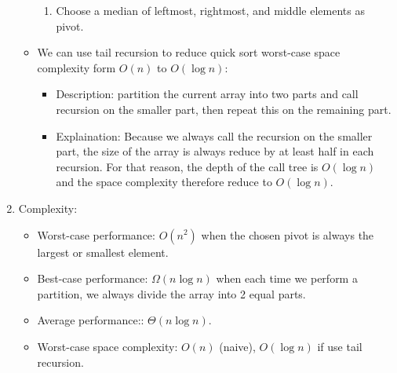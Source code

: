 \documentclass[12pt]{article}
\begin{document}
\begin{enumerate}
\begin{itemize}
\begin{enumerate}
                \item Choose a median of leftmost, rightmost, and middle elements as pivot.
            \end{enumerate}
            \item We can use tail recursion to reduce quick sort worst-case space complexity form $O(n)$ to $O(\log n)$:
            \begin{itemize}
                \item Description: partition the current array into two parts and call recursion on the smaller part, then repeat this on the remaining part.
                \item Explaination: Because we always call the recursion on the smaller part, the size of the array is always reduce by at least half in each recursion. For that reason, the depth of the call tree is $O(\log n)$ and the space complexity therefore reduce to $O(\log n)$.
            \end{itemize}
        \end{itemize}
        \item Complexity:
        \begin{itemize}
            \item Worst-case performance: $O(n^2)$ when the chosen pivot is always the largest or smallest element.
            \item Best-case performance: $\Omega(n\log n)$ when each time we perform a partition, we always divide the array into 2 equal parts.
            \item Average performance:: $\Theta(n\log n)$.
            \item Worst-case space complexity: $O(n)$ (naive), $O(\log n)$ if use tail recursion.
        \end{itemize}
    \end{enumerate}
\end{document}

